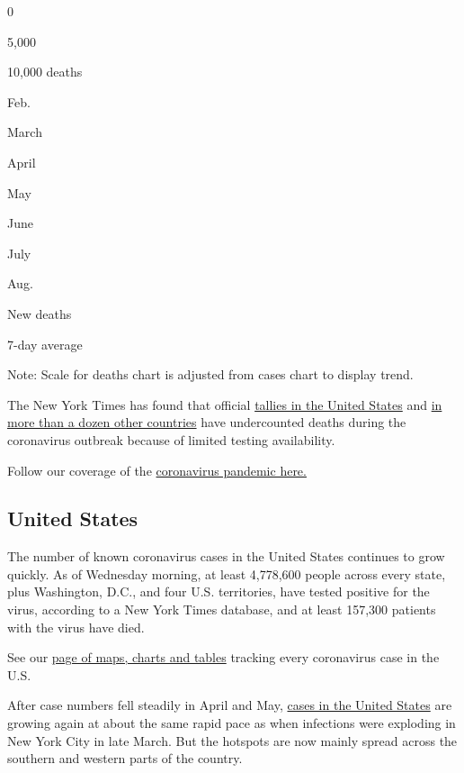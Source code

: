 0

5,000

10,000 deaths

Feb.

March

April

May

June

July

Aug.

New deaths

7-day average

Note: Scale for deaths chart is adjusted from cases chart to display
trend.

The New York Times has found that official
\href{https://www.nytimes3xbfgragh.onion/interactive/2020/04/28/us/coronavirus-death-toll-total.html}{tallies
in the United States} and
\href{https://www.nytimes3xbfgragh.onion/interactive/2020/04/21/world/coronavirus-missing-deaths.html}{in
more than a dozen other countries} have undercounted deaths during the
coronavirus outbreak because of limited testing availability.

Follow our coverage of the
\href{https://www.nytimes3xbfgragh.onion/2020/08/04/world/coronavirus-covid-19.html}{coronavirus
pandemic here.}

\hypertarget{united-states}{%
\subsection{United States}\label{united-states}}

The number of known coronavirus cases in the United States continues to
grow quickly. As of Wednesday morning, at least 4,778,600 people across
every state, plus Washington, D.C., and four U.S. territories, have
tested positive for the virus, according to a New York Times database,
and at least 157,300 patients with the virus have died.

See our
\href{https://www.nytimes3xbfgragh.onion/interactive/2020/us/coronavirus-us-cases.html}{page
of maps, charts and tables} tracking every coronavirus case in the U.S.

After case numbers fell steadily in April and May,
\href{https://www.nytimes3xbfgragh.onion/interactive/2020/us/coronavirus-us-cases.html}{cases
in the United States} are growing again at about the same rapid pace as
when infections were exploding in New York City in late March. But the
hotspots are now mainly spread across the southern and western parts of
the country.

